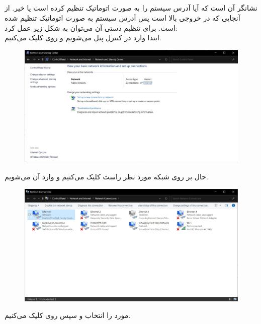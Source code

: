 \documentclass{article}
\begin{document}
\subsection{}
 نشانگر آن است که آیا  آدرس سیستم را به صورت اتوماتیک تنظیم کرده است یا خیر. از آنجایی که در خروجی بالا  است پس آدرس سیستم به صورت اتوماتیک تنظیم شده است. برای تنظیم دستی آن می‌توان به شکل زیر عمل کرد:\\
ابتدا وارد  در کنترل پنل می‌شویم و روی  کلیک می‌کنیم.
\begin{figure}[H]
    \centering
    \includegraphics[width=1.0\textwidth]{figures/3.4.1.jpg}
    \caption
	{
	}
    \label{fig:fig1}
\end{figure}
حال بر روی شبکه مورد نظر راست کلیک می‌کنیم و وارد  آن می‌شویم.
\begin{figure}[H]
    \centering
    \includegraphics[width=1.0\textwidth]{figures/3.4.2.jpg}
    \caption
	{
	}
    \label{fig:fig1}
\end{figure}
مورد  را انتخاب و سپس روی  کلیک می‌کنیم.
\end{document}
